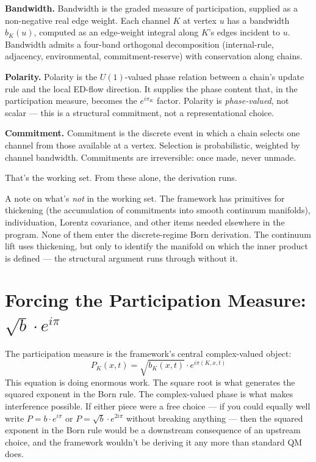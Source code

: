 \documentclass[11pt,a4paper]{article}
\begin{document}
\textbf{Bandwidth.} Bandwidth is the graded measure of participation, supplied as a non-negative real edge weight. Each channel $K$ at vertex $u$ has a bandwidth $b_K(u)$, computed as an edge-weight integral along $K$'s edges incident to $u$. Bandwidth admits a four-band orthogonal decomposition (internal-rule, adjacency, environmental, commitment-reserve) with conservation along chains.

\textbf{Polarity.} Polarity is the $U(1)$-valued phase relation between a chain's update rule and the local ED-flow direction. It supplies the phase content that, in the participation measure, becomes the $e^{i\pi_K}$ factor. Polarity is \emph{phase-valued}, not scalar --- this is a structural commitment, not a representational choice.

\textbf{Commitment.} Commitment is the discrete event in which a chain selects one channel from those available at a vertex. Selection is probabilistic, weighted by channel bandwidth. Commitments are irreversible: once made, never unmade.

That's the working set. From these alone, the derivation runs.

A note on what's \emph{not} in the working set. The framework has primitives for thickening (the accumulation of commitments into smooth continuum manifolds), individuation, Lorentz covariance, and other items needed elsewhere in the program. None of them enter the discrete-regime Born derivation. The continuum lift uses thickening, but only to identify the manifold on which the inner product is defined --- the structural argument runs through without it.

\section{Forcing the Participation Measure: $\sqrt{b}\cdot e^{i\pi}$}

The participation measure is the framework's central complex-valued object:
\[
P_K(x, t) = \sqrt{b_K(x, t)} \cdot e^{i\pi(K, x, t)}
\]
This equation is doing enormous work. The square root is what generates the squared exponent in the Born rule. The complex-valued phase is what makes interference possible. If either piece were a free choice --- if you could equally well write $P = b\cdot e^{i\pi}$ or $P = \sqrt{b}\cdot e^{2i\pi}$ without breaking anything --- then the squared exponent in the Born rule would be a downstream consequence of an upstream choice, and the framework wouldn't be deriving it any more than standard QM does.
\end{document}
